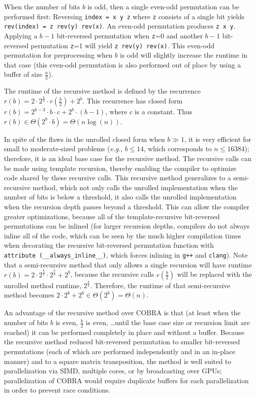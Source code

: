 ﻿\documentclass[10pt]{article}
\begin{document}
{When the number of bits $b$ is odd, then a single even-odd permutation
can be performed first: Reversing {\tt index = x~y~z} where {\tt z}
consists of a single bit yields {\tt rev(index) = z~rev(y)~rev(x)}. An
even-odd permutation produces {\tt z~x~y}. Applying a $b-1$
bit-reversed permutation when {\tt z}=0 and another $b-1$ bit-reversed
permutation {\tt z}=1 will yield {\tt z~rev(y)~rev(x)}. This even-odd
permutation for preprocessing when $b$ is odd will slightly increase
the runtime in that case (this even-odd permutation is also performed
out of place by using a buffer of size $\frac{n}{2}$).

The runtime of the recursive method is defined by the recurrence $r(b)
= 2 \cdot 2^{\frac{b}{2}} \cdot r(\frac{b}{2}) + 2^b$. This recurrence
has closed form $r(b) = 2^{b-3} \cdot b \cdot c + 2^b \cdot (b-1)$,
where $c$ is a constant. Thus $r(b) \in \Theta(2^b \cdot b) = \Theta(n
\log(n))$.

In spite of the flaws in the unrolled closed form when $b \gg 1$, it
is very efficient for small to moderate-sized problems (\emph{e.g.},
$b \leq 14$, which corresponds to $n \leq 16384$); therefore, it is an
ideal base case for the recursive method. The recursive calls can be
made using template recursion, thereby enabling the compiler to
optimize code shared by these recursive calls. This recursive method
generalizes to a semi-recursive method, which not only calls the
unrolled implementation when the number of bits is below a threshold,
it also calls the unrolled implementation when the recursion depth
passes beyond a threshold. This can allow the compiler greater
optimizations, because all of the template-recursive bit-reversed
permutations can be inlined (for larger recursion depths, compilers do
not always inline all of the code, which can be seen by the much
higher compilation times when decorating the recursive bit-reversed
permutation function with {\tt attribute~(\_\_always\_inline\_\_)},
which forces inlining in {\tt g++} and {\tt clang}). Note that a
semi-recursive method that only allows a single recursion will have
runtime $r(b) = 2 \cdot 2^{\frac{b}{2}} \cdot 2^{\frac{b}{2}} + 2^b$,
because the recursive calls $r(\frac{b}{2})$ will be replaced with the
unrolled method runtime, $2^{\frac{b}{2}}$. Therefore, the runtime of
that semi-recursive method becomes $2\cdot 2^b + 2^b \in \Theta(2^b) =
\Theta(n)$.

An advantage of the recursive method over COBRA is that (at least when
the number of bits $b$ is even, $\frac{b}{2}$ is even, \ldots until
the base case size or recursion limit are reached) it can be performed
completely in place and without a buffer. Because the recursive method
reduced bit-reversed permutation to smaller bit-reversed permutations
(each of which are performed independently and in an in-place manner)
and to a square matrix transposition, the method is well suited to
parallelization via SIMD, multiple cores, or by broadcasting over
GPUs; parallelization of COBRA would require duplicate buffers for
each parallelization in order to prevent race conditions.\newline

}
\end{document}
